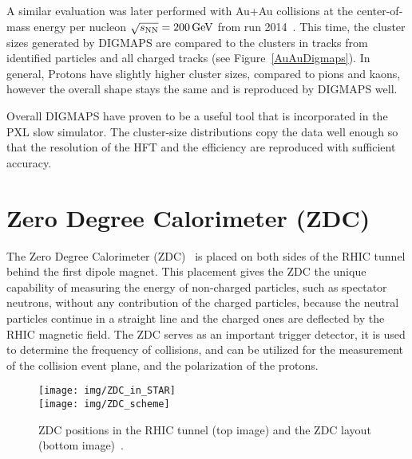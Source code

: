 A similar evaluation was later performed with Au+Au collisions at the center-of-mass energy per nucleon $\sqrt{s_\text{NN}} = \SI{200}{\giga\electronvolt}$ from run 2014~\cite{KubaVyzkumak}\@. This time, the cluster sizes generated by DIGMAPS are compared to the clusters in tracks from identified particles and all charged tracks (see Figure~\ref{AuAuDigmaps})\@.  In general, Protons have slightly higher cluster sizes, compared to pions and kaons, however the overall shape stays the same and is reproduced by DIGMAPS well.

Overall DIGMAPS have proven to be a useful tool that is incorporated in the PXL slow simulator. The cluster-size distributions copy the data well enough so that the resolution of the HFT and the efficiency are reproduced with sufficient accuracy.



\section{Zero Degree Calorimeter (ZDC)\label{ZDCsection}} 


The Zero Degree Calorimeter (ZDC)~\cite{ZDC, ZDCSMD} is placed on both sides of the RHIC tunnel behind the first dipole magnet. This placement gives the ZDC the unique capability of measuring the energy of non-charged particles, such as spectator neutrons, without any contribution of the charged particles, because the neutral particles continue in a straight line and the charged ones are deflected by the RHIC magnetic field. The ZDC serves as an important trigger detector, it is used
to determine the frequency of collisions, and can be utilized for the measurement of the collision event plane, and the polarization of the protons.

\begin{figure}[!htb]
\begin{center}
  \texttt{[image: img/ZDC\_in\_STAR]}\\
  \texttt{[image: img/ZDC\_scheme]}
\end{center}
\caption{\label{ZDC_scheme}ZDC positions in the RHIC tunnel (top image) and the ZDC layout (bottom image)~\cite{ZDCSMD}. }
\end{figure}


